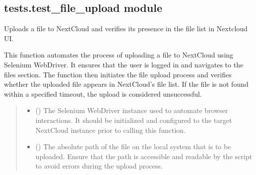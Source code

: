 \documentclass[letterpaper,10pt,english]{sphinxmanual}
\begin{document}
\subsection{tests.test\_file\_upload module}
\label{\detokenize{tests:module-tests.test_file_upload}}\label{\detokenize{tests:tests-test-file-upload-module}}

\begin{fulllineitems}
\label{\detokenize{tests:tests.test_file_upload.upload_file}}
\pysigstartsignatures
{}
\pysigstopsignatures
\sphinxAtStartPar
Uploads a file to NextCloud and verifies its presence in the file list in Nextcloud UI.

\sphinxAtStartPar
This function automates the process of uploading a file to NextCloud using Selenium WebDriver. It ensures that
the user is logged in and navigates to the files section. The function then initiates the file upload process and
verifies whether the uploaded file appears in NextCloud’s file list. If the file is not found within a specified
timeout, the upload is considered unsuccessful.
\begin{quote}\begin{description}
\begin{itemize}
\item {} 
\sphinxAtStartPar
{} () \textendash{} The Selenium WebDriver instance used to automate browser interactions. It should be
initialized and configured to the target NextCloud instance prior to calling this function.

\item {} 
\sphinxAtStartPar
{} () \textendash{} The absolute path of the file on the local system that is to be uploaded. Ensure that the
path is accessible and readable by the script to avoid errors during the upload process.


\end{itemize}
\end{description}
\end{quote}
\end{fulllineitems}
\end{document}
